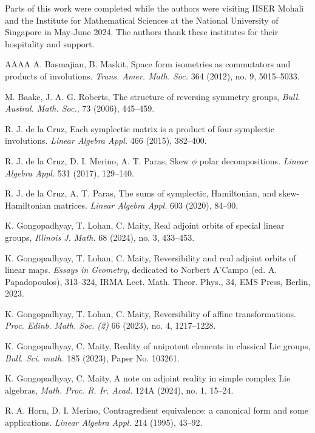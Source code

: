 \documentclass[11pt,reqno]{amsart}
\numberwithin{equation}{section}
\theoremstyle{definition}
\begin{document}
Parts of this work were completed while the authors were visiting IISER Mohali and the Institute for Mathematical Sciences at the National University of Singapore in May-June 2024. The authors thank these institutes for their hospitality and support.




\begin{thebibliography}{AAAA} 
 A. Basmajian, B. Maskit, Space form isometries as commutators and products of involutions. {\it Trans. Amer. Math. Soc.}  364 (2012),  no. 9,  5015--5033.
	
 M. Baake, J. A. G. Roberts, The structure of reversing symmetry groups, {\it Bull. Austral. Math. Soc.},  73 (2006), 445--459. 
	
 R. J. de la Cruz, Each symplectic matrix is a product of four symplectic involutions. \textit{Linear Algebra Appl.} 466 (2015), 382--400.
	
  R. J. de la Cruz,  D. I. Merino,  A. T. Paras, Skew $\phi$ polar decompositions. \textit{Linear Algebra Appl.} 531 (2017), 129--140.
	
	
  R. J. de la Cruz, A. T. Paras, The sums of symplectic, Hamiltonian, and skew-Hamiltonian matrices. \textit{Linear Algebra Appl.} 603 (2020), 84--90.
	
	
  K.  Gongopadhyay,  T.  Lohan, C.  Maity,  Real adjoint orbits of special linear groups, \textit{Illinois J. Math.} 68 (2024), no. 3, 433--453.
	
	K.  Gongopadhyay,  T.  Lohan, C.  Maity,   Reversibility and real adjoint orbits of linear maps. {\it Essays in Geometry}, dedicated to Norbert A'Campo (ed. A. Papadopoulos), 313--324, IRMA Lect. Math. Theor. Phys., 34, EMS Press, Berlin, 2023. 
	
   K.  Gongopadhyay,  T.  Lohan, C.  Maity,  Reversibility of affine transformations. \textit{Proc. Edinb. Math. Soc. (2)} 66 (2023), no. 4, 1217--1228.
	
	
 K. Gongopadhyay, C. Maity,  Reality of unipotent elements in classical Lie groups, \textit{Bull. Sci. math.} 185 (2023), Paper No.  103261.
	
 K. Gongopadhyay, C. Maity, A note on adjoint reality in simple complex Lie algebras, \textit{Math. Proc. R. Ir. Acad.} 124A (2024), no. 1, 15--24.
	
	
   R. A. Horn,   D. I. Merino, Contragredient equivalence: a canonical form and some applications. \textit{Linear Algebra Appl.} 214 (1995), 43--92.
	

\end{thebibliography}
\end{document}
